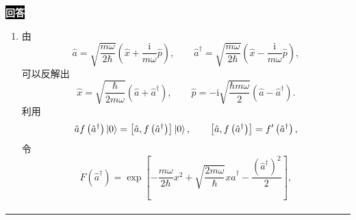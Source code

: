 \documentclass[11pt,a4paper]{ctexart}
\newenvironment{answer}
  {\par\smallskip\noindent
   \begingroup
   \setlength{\fboxsep}{4pt}%
   \colorbox{black}{\textcolor{white}{\bfseries 回答}}%
   \endgroup
   \quad\ignorespaces}
  {\par\smallskip\noindent\rule{\linewidth}{0.4pt}\medskip}
\begin{document}
\begin{answer}
\begin{enumerate}
\begin{equation}
\begin{aligned}
        &=\left(\frac{m\omega}{\pi\hbar}\right)^{1/4} \frac{1 }{\sqrt{2\pi\hbar} } \int\mathrm{d}x \exp\left[-\frac{m\omega}{2\hbar}x^2+\left(\sqrt{\frac{2m\omega}{\hbar}}\hat a^\dagger + \frac{\mathrm{i}p }{\hbar } \right)x  -\frac{\left(\hat a^\dagger\right)^2}{2}\right] \Ket{0 } \\
        &=\left(\frac{m\omega}{\pi\hbar}\right)^{1/4} \frac{1 }{\sqrt{2\pi\hbar} } \sqrt{\frac{2\pi\hbar }{m\omega } } \exp\left\{ \frac{\hbar }{2m\omega } \left[\frac{2m\omega }{\hbar } \left(\hat{a}^\dag \right)^2 + \frac{2\mathrm{i} }{\hbar } \sqrt{\frac{2m\omega }{\hbar } } p \hat{a}^\dag - \frac{p^2 }{\hbar^2 }   \right] \right\} \exp\left[-\frac{\left(\hat{a}^\dag \right)^2 }{2 } \right] \Ket{0 } \\
        &=\left(\frac{1}{m\omega\pi\hbar}\right)^{1/4}\exp\left[-\frac{p^2}{2m\omega\hbar}+\sqrt{\frac{2}{m\omega\hbar}}\,\mathrm{i}p\hat a^\dagger+\frac{\left(\hat a^\dagger\right)^2}{2}\right]\Ket{0}.
      \end{aligned}
    \end{equation}
    \item 由
    \begin{equation}
      \hat{a}
      =\sqrt{\frac{m\omega }{2\hbar } } \left(\hat{x} + \frac{\mathrm{i} }{m\omega } \hat{p} \right),\qquad
      \hat{a}^\dag
      =\sqrt{\frac{m\omega }{2\hbar } } \left(\hat{x} - \frac{\mathrm{i} }{m\omega } \hat{p} \right),
    \end{equation}
    可以反解出
    \begin{equation}
      \hat{x}
      =\sqrt{\frac{\hbar }{2m\omega } } \left(\hat{a}+\hat{a}^\dag \right),\qquad
      \hat{p}
      =-\mathrm{i} \sqrt{\frac{\hbar m \omega }{2 } } \left(\hat{a}-\hat{a}^\dag \right).
    \end{equation}
    利用
    \begin{equation}
      \hat{a} f\left(\hat{a}^\dag \right) \Ket{0 }
      =\left[\hat{a},f\left(\hat{a}^\dag \right) \right] \Ket{0 },\qquad
      \left[\hat{a},f\left(\hat{a}^\dag \right) \right]
      =f'\left(\hat{a}^\dag \right),
    \end{equation}
    令
    \begin{equation}
      F\left(\hat{a}^\dag \right)
      =\exp\left[-\frac{m\omega}{2\hbar}x^2+\sqrt{\frac{2m\omega}{\hbar}}x\hat a^\dagger-\frac{\left(\hat a^\dagger\right)^2}{2}\right],
    \end{equation}
    \begin{equation}
      \begin{aligned}

\end{aligned}
\end{equation}
\end{enumerate}
\end{answer}
\end{document}
